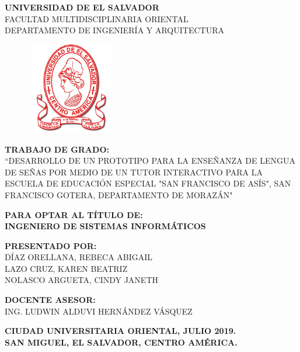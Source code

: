 \documentclass[12pt]{report}%
\begin{document}

\begin{center}%
\textbf{%
UNIVERSIDAD DE EL SALVADOR} \\ 
FACULTAD MULTIDISCIPLINARIA ORIENTAL \\%
DEPARTAMENTO DE INGENIERÍA Y ARQUITECTURA\\ 
 \vspace{1cm}%
 
\begin{figure}[h!]
	 \centering
	 \includegraphics[width=4cm, height=4cm]{minerva1.png}
	 \label{fig:minerva1}
 \end{figure}
 
\vspace{1cm}

\textbf{TRABAJO DE GRADO: }\\

“DESARROLLO DE UN PROTOTIPO PARA LA ENSEÑANZA DE LENGUA DE SEÑAS POR MEDIO DE UN TUTOR INTERACTIVO PARA LA ESCUELA DE EDUCACIÓN ESPECIAL "SAN FRANCISCO DE ASÍS", SAN FRANCISCO GOTERA, DEPARTAMENTO DE MORAZÁN" \\

\vspace{1cm}

\textbf{PARA OPTAR AL TÍTULO DE: }\\    
\textbf{INGENIERO DE SISTEMAS INFORMÁTICOS}\\   
\vspace{1cm}

\textbf{PRESENTADO POR: }\\                                          
DÍAZ ORELLANA, REBECA ABIGAIL  \\
LAZO CRUZ, KAREN BEATRIZ  \\
NOLASCO ARGUETA, CINDY JANETH \\
\vspace{1cm}

\textbf{DOCENTE ASESOR:} \\
ING. LUDWIN ALDUVI HERNÁNDEZ VÁSQUEZ \\ 
\vspace{1cm}

\textbf{CIUDAD UNIVERSITARIA ORIENTAL, JULIO 2019.}\\
\textbf{SAN MIGUEL, EL SALVADOR, CENTRO AMÉRICA.} \\
\end{center}
\end{document}
